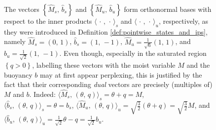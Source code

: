 \documentclass{article}
\begin{document}
\begin{figure}[h]
    \centering
    \caption{
        The vectors $\left\{ \widehat{M}_s,\, \widehat{b}_s \right\}$ and $\left\{ \widehat{M}_u,\, \widehat{b}_u \right\}$ form orthonormal bases with respect to the inner products ${\langle \,\cdot\,,\,\cdot\, \rangle}_{s}$ and ${\langle \,\cdot\,,\,\cdot\, \rangle}_{u}$, respectively, as they were introduced in Definition \ref{def:pointwise_states_and_ips}, namely $\widehat{M}_s = (0,\,1)$, $\widehat{b}_s = (1,\,-1)$, $\widehat{M}_u = \frac{1}{\sqrt{6}} (1,\,1)$, and $\widehat{b}_u = \frac{1}{\sqrt{2}} (1,\,-1)$. Even though, especially in the saturated region $\left\{ q > 0 \right\}$, labelling these vectors with the moist variable $M$ and the buoyancy $b$ may at first appear perplexing, this is justified by the fact that their corresponding \emph{dual} vectors are precisely (multiples of) $M$ and $b$. Indeed: ${\langle \widehat{M}_s ,\, (\theta,\,q) \rangle}_{s} = \theta + q = M$, ${\langle \widehat{b}_s ,\, (\theta,\,q) \rangle}_{s} = \theta = b_s$, ${\langle \widehat{M}_u ,\, (\theta,\,q) \rangle}_{u} = \sqrt{\frac{3}{2}} (\theta + q) = \sqrt{\frac{3}{2}} M$, and ${\langle \widehat{b}_u ,\, (\theta,\,q) \rangle}_{u} = \frac{1}{\sqrt{2}} \theta - q = \frac{1}{\sqrt{2}} b_u$.
    }
    \label{fig:orthonormal_bases}
\end{figure}
\end{document}
